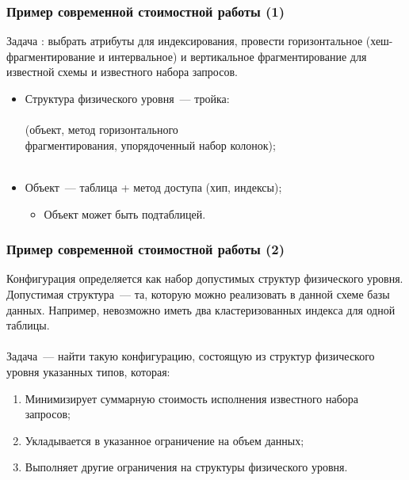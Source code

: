 \documentclass[unicode]{beamer}
\begin{document}
\begin{frame}
\frametitle{Пример современной стоимостной работы (1)}

Задача \cite{p12}: выбрать атрибуты для индексирования, провести горизонтальное (хеш-фрагментирование и интервальное) и вертикальное фрагментирование для известной схемы и известного набора запросов.
\begin{itemize}
  \item Структура физического уровня~--- тройка: \\~\\ (объект, метод горизонтального \\ фрагментирования, упорядоченный набор колонок); \\~\\
  \item Объект~--- таблица + метод доступа (хип, индексы);
  \begin{itemize}
    \item Объект может быть подтаблицей.
  \end{itemize}
\end{itemize}
  
\end{frame}

\begin{frame}
\frametitle{Пример современной стоимостной работы (2)}

Конфигурация определяется как набор допустимых структур физического уровня. Допустимая структура~--- та, которую можно реализовать в данной схеме базы данных. Например, невозможно иметь два кластеризованных индекса для одной таблицы.
\\~\\
Задача~--- найти такую конфигурацию, состоящую из структур физического уровня указанных типов, которая:

\begin{enumerate}
  \setlength\itemsep{1em}	
  \item Минимизирует суммарную стоимость исполнения известного набора запросов;
  \item Укладывается в указанное ограничение на объем данных;
  \item Выполняет другие ограничения на структуры физического уровня.
\end{enumerate}

\end{frame}
\end{document}
